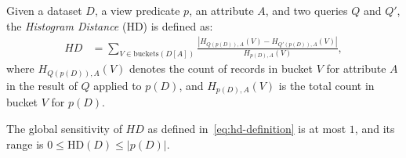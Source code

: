 \begin{definition}  
Given a dataset $D$, a view predicate $p$, an attribute $A$, 
and two queries $Q$ and $Q'$,  
the \emph{Histogram Distance} (HD) is defined as:
\begin{align}
HD &= \sum_{V \in \text{buckets}(D[A])} 
\frac{\left| H_{Q(p(D)),A}(V) - H_{Q'(p(D)),A}(V) \right|}
     {H_{p(D),A}(V)},
\label{eq:hd-definition}
\end{align}
where $H_{Q(p(D)),A}(V)$ denotes the count of records in bucket $V$ for attribute $A$
in the result of $Q$ applied to $p(D)$,  
and $H_{p(D),A}(V)$ is the total count in bucket $V$ for $p(D)$.
\end{definition}

\begin{proposition}
The global sensitivity of $HD$ as defined in~\eqref{eq:hd-definition} is at most $1$, and its range is $0 \le \mathrm{HD}(D) \le |p(D)|$.
\end{proposition}


